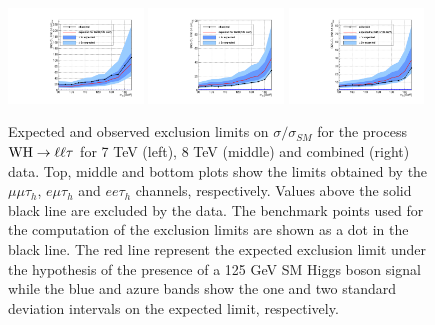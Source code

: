 \begin{figure}
\begin{center}
  \includegraphics[width=0.32\textwidth]{4_Analisys/pics/limits/eet/eet_injected_7TeV.pdf}
  \includegraphics[width=0.32\textwidth]{4_Analisys/pics/limits/eet/eet_injected_8TeV.pdf}
  \includegraphics[width=0.32\textwidth]{4_Analisys/pics/limits/eet/eet_injected.pdf} \\
  \caption{Expected and observed exclusion limits on $\sigma/\sigma_{SM}$ for the process $\mathrm{W}\mathrm{H} \rightarrow \ell \ell \tau$ for 7 TeV (left), 8 TeV (middle) and combined (right) data. Top, middle and bottom plots show the limits obtained by the $\mu\mu\tau_h$, $e\mu\tau_h$ and $ee\tau_h$ channels, respectively. Values above the solid black line are excluded by the data. The benchmark points used for the computation of the exclusion limits are shown as a dot in the black line. The red line represent the expected exclusion limit under the hypothesis of the presence of a 125 GeV SM Higgs boson signal while the blue and azure bands show the one and two standard deviation intervals on the expected limit, respectively.}
  \label{fig:llt_chan_injected}
\end{center}
\end{figure}


